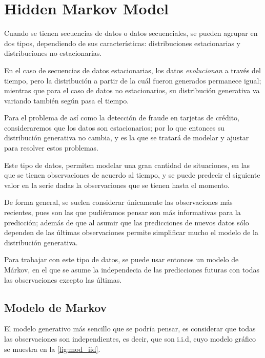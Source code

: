 
\chapter{Hidden Markov Model}\label{ch:chap2}

Cuando se tienen secuencias de datos o datos secuenciales, se pueden agrupar 
en dos tipos, dependiendo de sus características: distribuciones estacionarias 
y distribuciones no estacionarias.

En el caso de secuencias de datos estacionarias, los datos \textit{evolucionan}
a través del tiempo, pero la distribución a partir de la cuál fueron generados 
permanece igual; mientras que para el caso de datos no estacionarios, su distribución 
generativa va variando también según pasa el tiempo.

Para el problema de \sd así como la detección de fraude en tarjetas de crédito, consideraremos 
que los datos son estacionarios; por lo que entonces su distribución generativa no cambia, 
y es la que se tratará de modelar y ajustar para resolver estos problemas.

Este tipo de datos, permiten modelar una gran cantidad de situaciones, en las que se
tienen observaciones de acuerdo al tiempo, y se puede predecir el siguiente valor en
la serie dadas la observaciones que se tienen hasta el momento.

De forma general, se suelen considerar únicamente las observaciones más recientes, 
pues son las que pudiéramos pensar son más informativas para la predicción; 
además de que al asumir que las predicciones de nuevos datos sólo dependen de las últimas 
observaciones permite simplificar mucho el modelo de la distribución generativa.

Para trabajar con este tipo de datos, se puede usar entonces un modelo de Márkov, en el 
que se asume la independecia de las predicciones futuras con todas las observaciones 
excepto las últimas.

\section{Modelo de Markov}

El modelo generativo más sencillo que se podría pensar, es considerar que todas las 
observaciones son independientes, es decir, que son i.i.d, cuyo modelo gráfico se muestra
en la \autoref{fig:mod_iid}.

